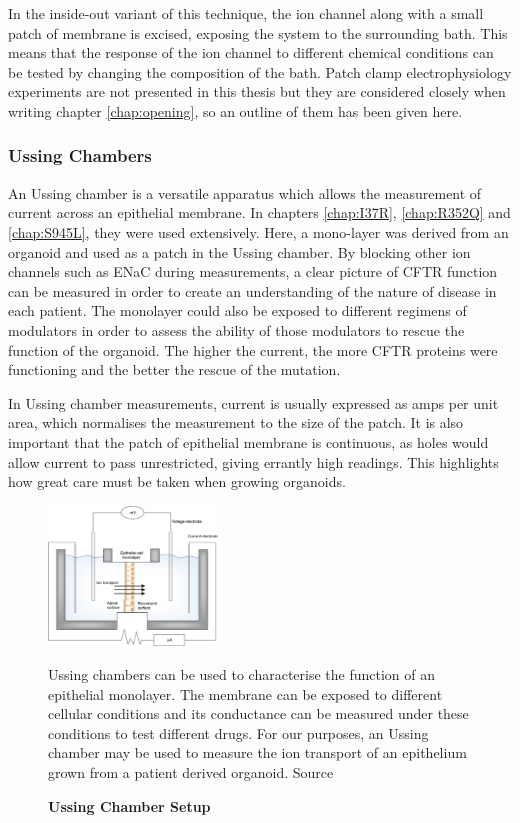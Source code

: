 In the inside-out variant of this technique, the ion channel along with a small patch of membrane is excised, exposing the system to the surrounding bath. This means that the response of the ion channel to different chemical conditions can be tested by changing the composition of the bath. Patch clamp electrophysiology experiments are not presented in this thesis but they are considered closely when writing chapter \ref{chap:opening},  so an outline of them has been given here.

\subsubsection{Ussing Chambers}
An Ussing chamber is a versatile apparatus which allows the measurement of current across an epithelial membrane. In chapters \ref{chap:I37R}, \ref{chap:R352Q} and \ref{chap:S945L}, they were used extensively. Here, a mono-layer was derived from an organoid and used as a patch in the Ussing chamber. By blocking other ion channels such as ENaC during measurements, a clear picture of CFTR function can be measured in order to create an understanding of the nature of disease in each patient. The monolayer could also be exposed to different regimens of modulators in order to assess the ability of those modulators to rescue the function of the organoid. The higher the current, the more CFTR proteins were functioning and the better the rescue of the mutation.

In Ussing chamber measurements, current is usually expressed as amps per unit area, which normalises the measurement to the size of the patch. It is also important that the patch of epithelial membrane is continuous, as holes would allow current to pass unrestricted, giving errantly high readings. This highlights how great care must be taken when growing organoids. 


\begin{figure}
	\begin{center}
	\includegraphics[width=0.4\textwidth]{figures/ussing_chamber.jpg}
	\end{center}
	\captionsetup{singlelinecheck = false, justification=raggedright}
	\caption[Ussing Chamber Setup] {\textbf{Ussing Chamber Setup}}{Ussing chambers can be used to characterise the function of an epithelial monolayer. The membrane can be exposed to different cellular conditions and its conductance can be measured under these conditions to test different drugs. For our purposes, an Ussing chamber may be used to measure the ion transport of an epithelium grown from a patient derived organoid. Source \cite{hoenig2014}} 
	\label{ussing_chamber}
\end{figure}


